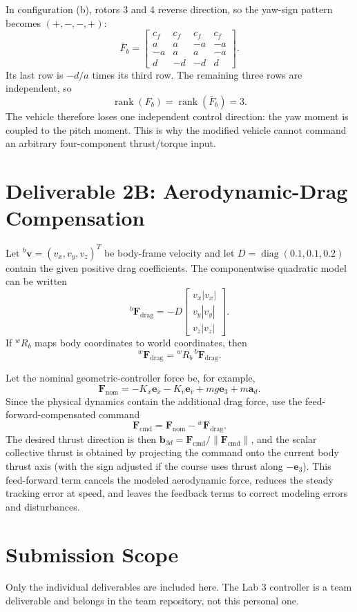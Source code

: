 \documentclass[11pt]{article}
\begin{document}
In configuration (b), rotors 3 and 4 reverse direction, so the yaw-sign pattern
becomes \((+,-,-,+)\):
\[
\bar F_b=
\begin{bmatrix}
c_f&c_f&c_f&c_f\\
a&a&-a&-a\\
-a&a&a&-a\\
d&-d&-d&d
\end{bmatrix}.
\]
Its last row is \(-d/a\) times its third row. The remaining three rows are
independent, so
\[
\operatorname{rank}(F_b)=\operatorname{rank}(\bar F_b)=3.
\]
The vehicle therefore loses one independent control direction: the yaw moment
is coupled to the pitch moment. This is why the modified vehicle cannot command
an arbitrary four-component thrust/torque input.

\section*{Deliverable 2B: Aerodynamic-Drag Compensation}
Let \({}^{b}\bm v=({v_x},{v_y},{v_z})^T\) be body-frame velocity and let
\(D=\operatorname{diag}(0.1,0.1,0.2)\) contain the given positive drag
coefficients.
The componentwise quadratic model can be written
\[
{}^{b}\bm F_{\mathrm{drag}}
=-D\begin{bmatrix}v_x|v_x|\\v_y|v_y|\\v_z|v_z|\end{bmatrix}.
\]
If \({}^{w}R_b\) maps body coordinates to world coordinates, then
\[
{}^{w}\bm F_{\mathrm{drag}}
={}^{w}R_b\,{}^{b}\bm F_{\mathrm{drag}}.
\]

Let the nominal geometric-controller force be, for example,
\[
\bm F_{\mathrm{nom}}
=-K_x\bm e_x-K_v\bm e_v+mg\bm e_3+m\bm a_d.
\]
Since the physical dynamics contain the additional drag force, use the
feed-forward-compensated command
\[
\boxed{\bm F_{\mathrm{cmd}}
=\bm F_{\mathrm{nom}}-{}^{w}\bm F_{\mathrm{drag}}.}
\]
The desired thrust direction is then
\(\bm b_{3d}=\bm F_{\mathrm{cmd}}/\|\bm F_{\mathrm{cmd}}\|\), and the scalar
collective thrust is obtained by projecting the command onto the current body
thrust axis (with the sign adjusted if the course uses thrust along
\(-\bm e_3\)). This feed-forward term cancels the modeled aerodynamic force,
reduces the steady tracking error at speed, and leaves the feedback terms to
correct modeling errors and disturbances.

\section*{Submission Scope}
Only the individual deliverables are included here. The Lab 3 controller is a
team deliverable and belongs in the team repository, not this personal one.
\end{document}
